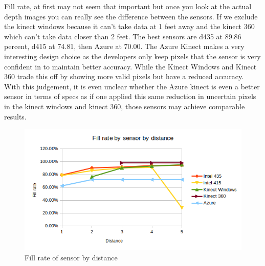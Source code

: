 Fill rate, at first may not seem that important but once you look at the actual depth images you can really see the difference between the sensors. If we exclude the kinect windows because it can't take data at 1 feet away and the kinect 360 which can't take data closer than 2 feet. The best sensors are d435 at 89.86 percent, d415 at 74.81, then Azure at 70.00. The Azure Kinect makes a very interesting design choice as the developers only keep pixels that the sensor is very confident in to maintain better accuracy. While the Kinect Windows and Kinect 360 trade this off by showing more valid pixels but have a reduced accuracy. With this judgement, it is even unclear whether the Azure kinect is even a better sensor in terms of specs as if one applied this same reduction in uncertain pixels in the kinect windows and kinect 360, those sensors may achieve comparable results.

\begin{figure}[h]
	\caption{Fill rate of sensor by distance}
	\centering
	\includegraphics[]{images/fill_rate.png}
\end{figure}


